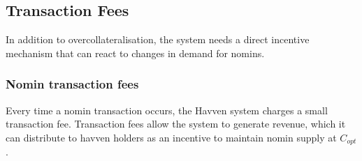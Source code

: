 







\newpage
\subsection{Transaction Fees} In addition to overcollateralisation, the system needs a direct incentive mechanism that can react to changes in demand for nomins.

\subsubsection{Nomin transaction fees} Every time a nomin transaction occurs, the Havven system charges a small transaction fee. Transaction fees allow the system to generate revenue, which it can distribute to havven holders as an incentive to maintain nomin supply at $C_{opt}$. \\

